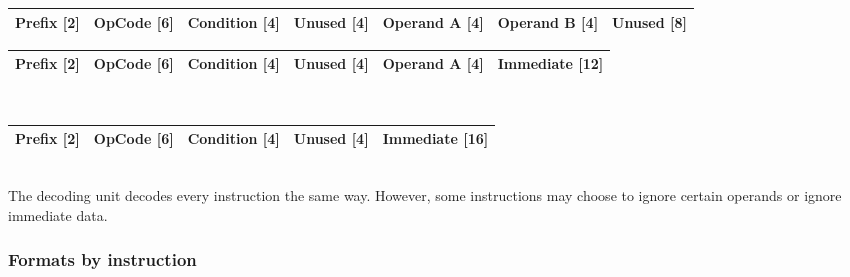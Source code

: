 
\begin{tabular}{ | r | r | r | r | r | r | r | }
	\hline
	Prefix [2] & OpCode [6] & Condition [4] & Unused [4] & Operand A [4] & Operand B [4] & Unused [8] \\
	\hline
\end{tabular}


\begin{tabular}{ | r | r | r | r | r | r | }
	\hline
	Prefix [2] & OpCode [6] & Condition [4] & Unused [4] & Operand A [4] & Immediate [12] \\
	\hline
\end{tabular} \\


\begin{tabular}{ | r | r | r | r | r | }
	\hline
	Prefix [2] & OpCode [6] & Condition [4] & Unused [4] & Immediate [16] \\
	\hline
\end{tabular} \\


The decoding unit decodes every instruction the same way. However, some instructions may choose to ignore certain operands or ignore immediate data. 

\newpage

\subsubsection{Formats by instruction}

